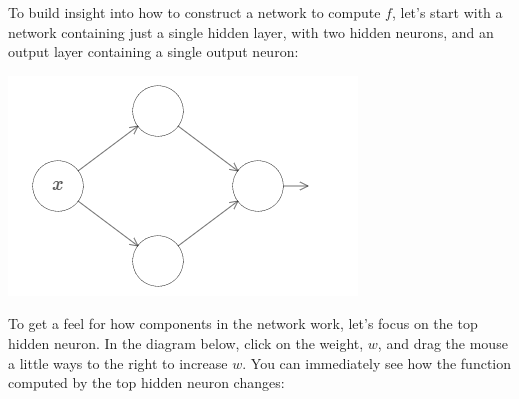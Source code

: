 \documentclass[a4paper,twoside,10pt]{book}
\begin{document}
To build insight into how to construct a network to compute $f$, let's start with a network containing just a single hidden layer, with two hidden neurons, and an output layer containing a single output neuron:
\begin{center}
	\includegraphics[width=0.45\linewidth]{figures/ch4/tikz403}
\end{center}
To get a feel for how components in the network work, let's focus on the top hidden neuron. In the diagram below, click on the weight, $w$, and drag the mouse a little ways to the right to increase $w$. You can immediately see how the function computed by the top hidden neuron changes:
\end{document}
